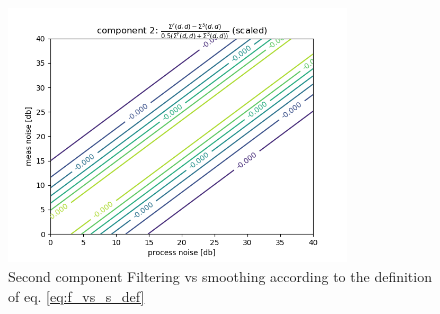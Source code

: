 \documentclass[oneside,12pt]{article}
\begin{document}
%
%
\begin{figure}
    \centering
        \includegraphics[width=0.8\textwidth]{./component_2_delta}
        \caption{\label{fig:component_2_delta}Second component Filtering vs smoothing according to the definition of eq. \ref{eq:f_vs_s_def}}
\end{figure}
%
\end{document}
